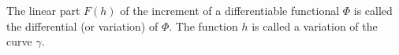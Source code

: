 The linear part $F(h)$ of the increment of a differentiable functional $\Phi$ is called the differential (or variation) of $\Phi$. The function $h$ is called a variation of the curve $\gamma$.

